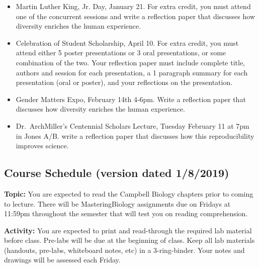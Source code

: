 \documentclass{tufte-handout}
\begin{document}
\begin{fullwidth}
\begin{itemize}
\item Martin Luther King, Jr. Day, January 21. For extra credit, you must attend one of the concurrent sessions and write a reflection paper that discusses how diversity enriches the human experience. 
\item Celebration of Student Scholarship, April 10.  For extra credit, you must attend either 5 poster presentations or 3 oral presentations, or some combination of the two.  Your reflection paper must include complete title, authors and session for each presentation, a 1 paragraph summary for each presentation (oral or poster), and your reflections on the presentation.  	
\item Gender Matters Expo, February 14th 4-6pm. Write a reflection paper that discusses how diversity enriches the human experience.
\item Dr.\ ArchMiller's Centennial Scholars Lecture, Tuesday February 11 at 7pm in Jones A/B. write a reflection paper that discusses how this reproducibility improves science.
\end{itemize}









\newpage
\subsection{Course Schedule (version dated 1/8/2019)}
%

\textbf{Topic:} You are expected to read the Campbell Biology chapters prior to coming to lecture.  There will be MasteringBiology assignments due on Fridays at 11:59pm throughout the semester that will test you on reading comprehension. 

\textbf{Activity:} You are expected to print and read-through the required lab material before class. Pre-labs will be due at the beginning of class. Keep all lab materials (handouts, pre-labs, whiteboard notes, etc) in a 3-ring-binder. Your notes and drawings will be assessed each Friday.


\end{fullwidth}
\end{document}
